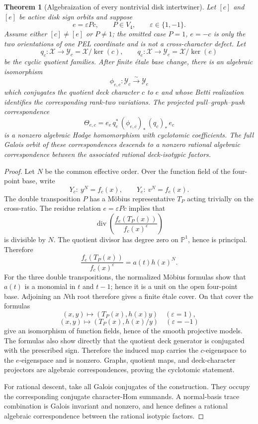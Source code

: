 \documentclass[11pt]{article}
\newtheorem{theorem}{Theorem}[section]
\theoremstyle{definition}
\theoremstyle{remark}
\newcommand{\PP}{\mathbb P}
\begin{document}
\begin{theorem}[Algebraization of every nontrivial disk intertwiner]\label{thm:algebraization}
Let $[c]$ and $[e]$ be active disk sign orbits and suppose
\[
 e=\varepsilon Pc,
 \qquad P\in V_4,
 \qquad \varepsilon\in\{1,-1\}.
\]
Assume either $[c]\ne[e]$ or $P\ne1$; the omitted case $P=1$, $e=-c$ is only the two orientations of one PEL coordinate and is not a cross-character defect.  Let
\[
 q_c:\mathcal X\to\mathcal Y_c=\mathcal X/\ker(c),
 \qquad
 q_e:\mathcal X\to\mathcal Y_e=\mathcal X/\ker(e)
\]
be the cyclic quotient families.  After finite \'etale base change, there is an algebraic isomorphism
\[
 \phi_{e,c}:\mathcal Y_c\xrightarrow{\sim}\mathcal Y_e
\]
which conjugates the quotient deck character $c$ to $e$ and whose Betti realization identifies the corresponding rank-two variations.  The projected pull--graph--push correspondence
\begin{equation}\label{eq:theta}
 \Theta_{e,c}
 =e_e\,q_e^*\,(\phi_{e,c})_*\,(q_c)_*\,e_c
\end{equation}
is a nonzero algebraic Hodge homomorphism with cyclotomic coefficients.  The full Galois orbit of these correspondences descends to a nonzero rational algebraic correspondence between the associated rational deck-isotypic factors.
\end{theorem}

\begin{proof}
Let $N$ be the common effective order.  Over the function field of the four-point base, write
\[
 Y_c:\ y^N=f_c(x),
 \qquad
 Y_e:\ v^N=f_e(x).
\]
The double transposition $P$ has a M\"obius representative $T_P$ acting trivially on the cross-ratio.  The residue relation $e=\varepsilon Pc$ implies that
\[
 \operatorname{div}\left(
 \frac{f_e(T_P(x))}{f_c(x)^\varepsilon}
 \right)
\]
is divisible by $N$.  The quotient divisor has degree zero on $\PP^1$, hence is principal.  Therefore
\[
 \frac{f_e(T_P(x))}{f_c(x)^\varepsilon}=a(t)h(x)^N.
\]
For the three double transpositions, the normalized M\"obius formulas show that $a(t)$ is a monomial in $t$ and $t-1$; hence it is a unit on the open four-point base.  Adjoining an $N$th root therefore gives a finite \'etale cover.  On that cover the formulas
\[
 (x,y)\longmapsto(T_P(x),h(x)y)
 \quad(\varepsilon=1),
\]
\[
 (x,y)\longmapsto(T_P(x),h(x)/y)
 \quad(\varepsilon=-1)
\]
give an isomorphism of function fields, hence of the smooth projective models.  The formulas also show directly that the quotient deck generator is conjugated with the prescribed sign.  Therefore the induced map carries the $c$-eigenspace to the $e$-eigenspace and is nonzero.  Graphs, quotient maps, and deck-character projectors are algebraic correspondences, proving the cyclotomic statement.

For rational descent, take all Galois conjugates of the construction.  They occupy the corresponding conjugate character-Hom summands.  A normal-basis trace combination is Galois invariant and nonzero, and hence defines a rational algebraic correspondence between the rational isotypic factors.
\end{proof}
\end{document}
